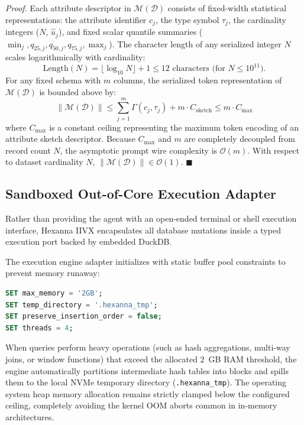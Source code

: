 \noindent\textit{Proof.} Each attribute descriptor in $\mathcal{M}(\mathcal{D})$ consists of fixed-width statistical representations: the attribute identifier $c_j$, the type symbol $\tau_j$, the cardinality integers ($N$, $\hat{u}_j$), and fixed scalar quantile summaries ($\min_j, q_{25, j}, q_{50, j}, q_{75, j}, \max_j$). The character length of any serialized integer $N$ scales logarithmically with cardinality:
\begin{equation}
    \text{Length}(N) = \lfloor \log_{10} N \rfloor + 1 \le 12 \text{ characters (for } N \le 10^{11}\text{)}.
\end{equation}
For any fixed schema with $m$ columns, the serialized token representation of $\mathcal{M}(\mathcal{D})$ is bounded above by:
\begin{equation}
    \|\mathcal{M}(\mathcal{D})\| \le \sum_{j=1}^m \Gamma(c_j, \tau_j) + m \cdot C_{\text{sketch}} \le m \cdot C_{\max}
\end{equation}
where $C_{\max}$ is a constant ceiling representing the maximum token encoding of an attribute sketch descriptor. Because $C_{\max}$ and $m$ are completely decoupled from record count $N$, the asymptotic prompt wire complexity is $\mathcal{O}(m)$. With respect to dataset cardinality $N$, $\|\mathcal{M}(\mathcal{D})\| \in \mathcal{O}(1)$. $\blacksquare$

\subsection{Sandboxed Out-of-Core Execution Adapter}
Rather than providing the agent with an open-ended terminal or shell execution interface, Hexanna IIVX encapsulates all database mutations inside a typed execution port backed by embedded DuckDB. 

The execution engine adapter initializes with static buffer pool constraints to prevent memory runaway:
\begin{lstlisting}[language=SQL]
SET max_memory = '2GB';
SET temp_directory = '.hexanna_tmp';
SET preserve_insertion_order = false;
SET threads = 4;
\end{lstlisting}

When queries perform heavy operations (such as hash aggregations, multi-way joins, or window functions) that exceed the allocated $2$~GB RAM threshold, the engine automatically partitions intermediate hash tables into blocks and spills them to the local NVMe temporary directory (\texttt{.hexanna\_tmp}). The operating system heap memory allocation remains strictly clamped below the configured ceiling, completely avoiding the kernel OOM aborts common in in-memory architectures.

